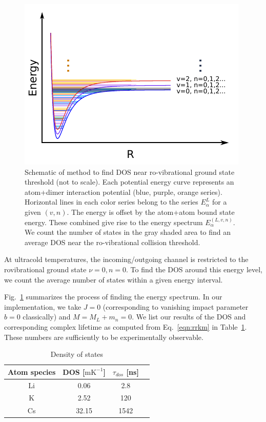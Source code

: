 \documentclass[%
 reprint,
 amsmath,amssymb,
 aps,
 nofootinbib
]{revtex4-1}
\begin{document}
\begin{figure}
\includegraphics{figures/dos}
\caption{\label{fig:dos}Schematic of method to find DOS near ro-vibrational ground state threshold (not to scale). Each potential energy curve represents an atom+dimer interaction potential (blue, purple, orange series). Horizontal lines in each color series belong to the series $E_{\alpha}^L$ for a given $(v,n)$. The energy is offset by the atom+atom bound state energy. These combined give rise to the energy spectrum $E_\alpha^{(L,v,n)}$. We count the number of states in the gray shaded area to find an average DOS near the ro-vibrational collision threshold.}
\end{figure}


At ultracold temperatures, the incoming/outgoing channel is restricted to the rovibrational ground state $\nu = 0, n = 0$. To find the DOS around this energy level, we count the average number of states within a given energy interval.

Fig.~\ref{fig:dos} summarizes the process of finding the energy spectrum. In our implementation, we take $J=0$ (corresponding to vanishing impact parameter $b=0$ classically) and $M=M_L+m_n=0$. We list our results of the DOS and corresponding complex lifetime as computed from Eq.~\ref{eqn:rrkm} in Table~\ref{tab:dos}. These numbers are sufficiently to be experimentally observable.

\begin{table}[b]
\caption{\label{tab:dos}Density of states}
\begin{ruledtabular}
\begin{tabular}{cccc}
 Atom species & DOS [$\text{mK}^{-1}$] & $\tau_{dos}$ [ns] \\
\hline
Li & 0.06 & 2.8   \\
K & 2.52 & 120  \\
Cs & 32.15 & 1542 
\end{tabular}
\end{ruledtabular}
\end{table}
\end{document}
